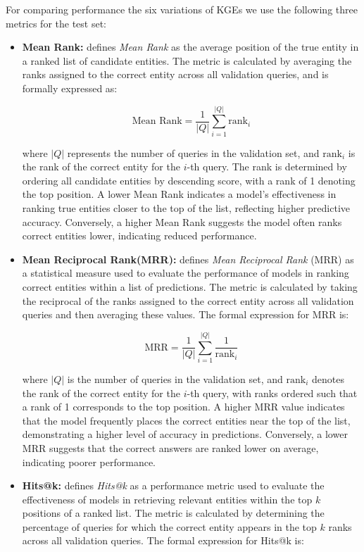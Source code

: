 \documentclass[12pt]{article}
\begin{document}
For comparing performance the six variations of KGEs we use the following three metrics for the test set:
\begin{itemize}
    \item \textbf{Mean Rank:} \textcite{bordes2013translating} defines \textit{Mean Rank} as the average position of the true entity in a ranked list of candidate entities. The metric is calculated by averaging the ranks assigned to the correct entity across all validation queries, and is formally expressed as:

\[
\text{Mean Rank} = \frac{1}{|Q|} \sum_{i=1}^{|Q|} \text{rank}_i
\]

where \( |Q| \) represents the number of queries in the validation set, and \( \text{rank}_i \) is the rank of the correct entity for the \(i\)-th query. The rank is determined by ordering all candidate entities by descending score, with a rank of 1 denoting the top position. A lower Mean Rank indicates a model's effectiveness in ranking true entities closer to the top of the list, reflecting higher predictive accuracy. Conversely, a higher Mean Rank suggests the model often ranks correct entities lower, indicating reduced performance.
 
    \item \textbf{Mean Reciprocal Rank(MRR):}  \textcite{yang2015embedding} defines \textit{Mean Reciprocal Rank} (MRR) as a statistical measure used to evaluate the performance of models in ranking correct entities within a list of predictions. The metric is calculated by taking the reciprocal of the ranks assigned to the correct entity across all validation queries and then averaging these values. The formal expression for MRR is:

\[
\text{MRR} = \frac{1}{|Q|} \sum_{i=1}^{|Q|} \frac{1}{\text{rank}_i}
\]

where \( |Q| \) is the number of queries in the validation set, and \( \text{rank}_i \) denotes the rank of the correct entity for the \(i\)-th query, with ranks ordered such that a rank of 1 corresponds to the top position. A higher MRR value indicates that the model frequently places the correct entities near the top of the list, demonstrating a higher level of accuracy in predictions. Conversely, a lower MRR suggests that the correct answers are ranked lower on average, indicating poorer performance.

    \item \textbf{Hits@k:} \textcite{yang2015embedding} defines \textit{Hits@k} as a performance metric used to evaluate the effectiveness of models in retrieving relevant entities within the top \( k \) positions of a ranked list. The metric is calculated by determining the percentage of queries for which the correct entity appears in the top \( k \) ranks across all validation queries. The formal expression for Hits@k is:


\end{itemize}
\end{document}
